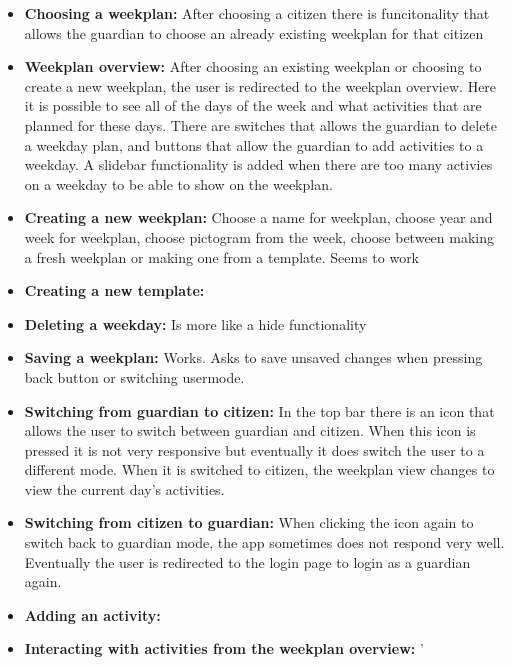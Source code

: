 \begin{itemize}
    \item \textbf{Choosing a weekplan:} After choosing a citizen there is funcitonality that allows the guardian to choose an already existing weekplan for that citizen
    \\
    \item \textbf{Weekplan overview:} After choosing an existing weekplan or choosing to create a new weekplan, the user is redirected to the weekplan overview. 
    Here it is possible to see all of the days of the week and what activities that are planned for these days. There are switches that allows the guardian to delete a weekday plan, and buttons that allow the guardian to add activities to a weekday. 
    A slidebar functionality is added when there are too many activies on a weekday to be able to show on the weekplan.
    \\
    \item \textbf{Creating a new weekplan:} Choose a name for weekplan, choose year and week for weekplan, choose pictogram from the week, choose between making a fresh weekplan or making one from a template. Seems to work
    \item \textbf{Creating a new template:} 
    \item \textbf{Deleting a weekday:} Is more like a hide functionality
    \item \textbf{Saving a weekplan:} Works. Asks to save unsaved changes when pressing back button or switching usermode.
    \item \textbf{Switching from guardian to citizen:} In the top bar there is an icon that allows the user to switch between guardian and citizen. 
    When this icon is pressed it is not very responsive but eventually it does switch the user to a different mode. 
    When it is switched to citizen, the weekplan view changes to view the current day's activities.
    \\
    \item \textbf{Switching from citizen to guardian:} When clicking the icon again to switch back to guardian mode, the app sometimes does not respond very well. 
    Eventually the user is redirected to the login page to login as a guardian again.
    \\
    \item \textbf{Adding an activity:} 

    \item \textbf{Interacting with activities from the weekplan overview:} '
    \\
\end{itemize}